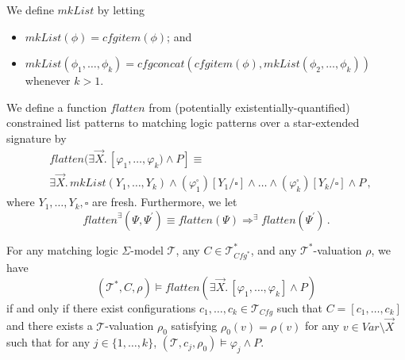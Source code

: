 \begin{definition}\label{def:mkList}
We define $\mathit{mkList}$ by letting
\begin{itemize}
    \item $\mathit{mkList}(\phi) = \mathit{cfgitem}(\phi)$; and
    \item $\mathit{mkList}(\phi_1, \ldots, \phi_k) = \mathit{cfgconcat}(\mathit{cfgitem}(\phi), \mathit{mkList}(\phi_2, \ldots, \phi_k))$ whenever $k > 1$.
\end{itemize}
\end{definition}

\begin{definition}\label{def:flatten}
    We define a function $\mathit{flatten}$ from (potentially existentially-quantified) constrained list patterns
    to matching logic patterns over a star-extended signature by
    \begin{align*}
        & \mathit{flatten}(\exists \vec{X}.\, [\varphi_1, \ldots, \varphi_k) \land P] \equiv \\
        & \exists \vec{X}.\, \mathit{mkList}(Y_1, \ldots, Y_k)
        \land (\varphi_1^\square)[Y_1/\square] \land \ldots
        \land (\varphi_k^\square)[Y_k/\square] \land P \, ,
    \end{align*}
    where $Y_1,\ldots,Y_k,\square$ are fresh.
    Furthermore, we let
    \begin{equation*}
        \mathit{flatten}^\exists(\Psi,\Psi^\prime) \equiv \mathit{flatten}(\Psi) \Rightarrow^\exists \mathit{flatten}(\Psi^\prime) \, .
    \end{equation*}
\end{definition}


\begin{lemma}[On Flattening]\label{lem:flatten}
    For any matching logic $\Sigma$-model $\mathcal{T}$, any $C \in \mathcal{T}^*_{\mathit{Cfg}^*}$,
    and any $\mathcal{T}^*$-valuation $\rho$, we have
        \begin{equation*}
            (\mathcal{T}^*, C, \rho) \vDash \mathit{flatten}(\exists \vec{X}.\, [\varphi_1,\ldots,\varphi_k] \land P)
        \end{equation*}
    if and only if
        there exist configurations $c_1, \ldots, c_k \in \mathcal{T}_{\mathit{Cfg}}$ such that
        $C = [c_1, \ldots, c_k]$ and there exists a $\mathcal{T}$-valuation $\rho_0$
        satisfying $\rho_0(v) = \rho(v)$ for any $v \in \mathit{Var} \setminus \vec{X}$
        such that for any $j \in \{ 1, \ldots, k \}$,
        $(\mathcal{T}, c_j, \rho_0) \vDash \varphi_j \land P$.
\end{lemma}


